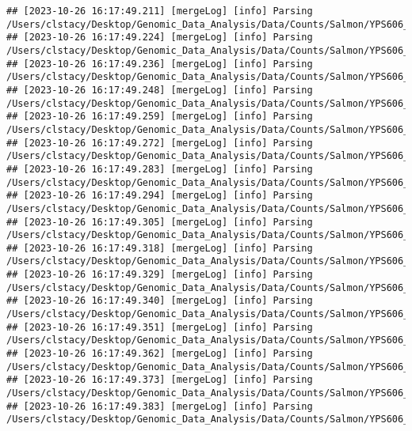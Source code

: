 \documentclass[
]{book}
\begin{document}
\begin{verbatim}
## [2023-10-26 16:17:49.211] [mergeLog] [info] Parsing /Users/clstacy/Desktop/Genomic_Data_Analysis/Data/Counts/Salmon/YPS606_MSN24_ETOH_REP1_R1.fastq.gz_quant/quant.sf
## [2023-10-26 16:17:49.224] [mergeLog] [info] Parsing /Users/clstacy/Desktop/Genomic_Data_Analysis/Data/Counts/Salmon/YPS606_MSN24_ETOH_REP2_R1.fastq.gz_quant/quant.sf
## [2023-10-26 16:17:49.236] [mergeLog] [info] Parsing /Users/clstacy/Desktop/Genomic_Data_Analysis/Data/Counts/Salmon/YPS606_MSN24_ETOH_REP3_R1.fastq.gz_quant/quant.sf
## [2023-10-26 16:17:49.248] [mergeLog] [info] Parsing /Users/clstacy/Desktop/Genomic_Data_Analysis/Data/Counts/Salmon/YPS606_MSN24_ETOH_REP4_R1.fastq.gz_quant/quant.sf
## [2023-10-26 16:17:49.259] [mergeLog] [info] Parsing /Users/clstacy/Desktop/Genomic_Data_Analysis/Data/Counts/Salmon/YPS606_MSN24_MOCK_REP1_R1.fastq.gz_quant/quant.sf
## [2023-10-26 16:17:49.272] [mergeLog] [info] Parsing /Users/clstacy/Desktop/Genomic_Data_Analysis/Data/Counts/Salmon/YPS606_MSN24_MOCK_REP2_R1.fastq.gz_quant/quant.sf
## [2023-10-26 16:17:49.283] [mergeLog] [info] Parsing /Users/clstacy/Desktop/Genomic_Data_Analysis/Data/Counts/Salmon/YPS606_MSN24_MOCK_REP3_R1.fastq.gz_quant/quant.sf
## [2023-10-26 16:17:49.294] [mergeLog] [info] Parsing /Users/clstacy/Desktop/Genomic_Data_Analysis/Data/Counts/Salmon/YPS606_MSN24_MOCK_REP4_R1.fastq.gz_quant/quant.sf
## [2023-10-26 16:17:49.305] [mergeLog] [info] Parsing /Users/clstacy/Desktop/Genomic_Data_Analysis/Data/Counts/Salmon/YPS606_WT_ETOH_REP1_R1.fastq.gz_quant/quant.sf
## [2023-10-26 16:17:49.318] [mergeLog] [info] Parsing /Users/clstacy/Desktop/Genomic_Data_Analysis/Data/Counts/Salmon/YPS606_WT_ETOH_REP2_R1.fastq.gz_quant/quant.sf
## [2023-10-26 16:17:49.329] [mergeLog] [info] Parsing /Users/clstacy/Desktop/Genomic_Data_Analysis/Data/Counts/Salmon/YPS606_WT_ETOH_REP3_R1.fastq.gz_quant/quant.sf
## [2023-10-26 16:17:49.340] [mergeLog] [info] Parsing /Users/clstacy/Desktop/Genomic_Data_Analysis/Data/Counts/Salmon/YPS606_WT_ETOH_REP4_R1.fastq.gz_quant/quant.sf
## [2023-10-26 16:17:49.351] [mergeLog] [info] Parsing /Users/clstacy/Desktop/Genomic_Data_Analysis/Data/Counts/Salmon/YPS606_WT_MOCK_REP1_R1.fastq.gz_quant/quant.sf
## [2023-10-26 16:17:49.362] [mergeLog] [info] Parsing /Users/clstacy/Desktop/Genomic_Data_Analysis/Data/Counts/Salmon/YPS606_WT_MOCK_REP2_R1.fastq.gz_quant/quant.sf
## [2023-10-26 16:17:49.373] [mergeLog] [info] Parsing /Users/clstacy/Desktop/Genomic_Data_Analysis/Data/Counts/Salmon/YPS606_WT_MOCK_REP3_R1.fastq.gz_quant/quant.sf
## [2023-10-26 16:17:49.383] [mergeLog] [info] Parsing /Users/clstacy/Desktop/Genomic_Data_Analysis/Data/Counts/Salmon/YPS606_WT_MOCK_REP4_R1.fastq.gz_quant/quant.sf

\end{verbatim}
\end{document}
